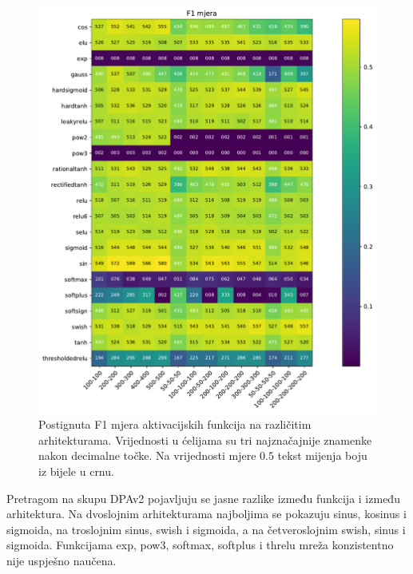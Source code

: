 \documentclass[times, utf8, numeric, diplomski]{fer}
\def\TODO#1{\noindent\textcolor{red}{TODO: \textit{#1}}\newline}
\def\todo#1{\TODO{#1}}
\def\todoimg#1{\begin{center} \textcolor{red}{\big[ IMAGE: \textit{#1} \big]} \end{center}}
\begin{document}
\begin{figure}[H]
\includegraphics[width=\textwidth]{greedy_256_f1.pdf}
\centering
\caption{Postignuta F1 mjera aktivacijskih funkcija na različitim arhitekturama. Vrijednosti u ćelijama su tri najznačajnije znamenke nakon decimalne točke. Na vrijednosti mjere $0.5$ tekst mijenja boju iz bijele u crnu.}
\label{fig:greedy_256_f1}
\end{figure}

Pretragom na skupu DPAv2 pojavljuju se jasne razlike između funkcija i između arhitektura. Na dvoslojnim arhitekturama najboljima se pokazuju sinus, kosinus i sigmoida, na troslojnim sinus, swish i sigmoida, a na četveroslojnim swish, sinus i sigmoida. Funkcijama exp, pow3, softmax, softplus i threlu mreža konzistentno nije uspješno naučena. 

\end{document}
